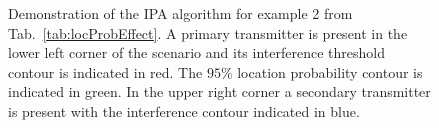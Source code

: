 \begin{figure}
\caption{\label{fig:iterationsLP} Demonstration of the IPA algorithm for example 2 from 
Tab.~\ref{tab:locProbEffect}. A primary transmitter is present in the lower left corner of the scenario and its interference threshold contour is indicated in red. The $95\%$ location probability contour is indicated in green. In the upper right corner a secondary transmitter is present with the interference contour indicated in blue.}
\end{figure}